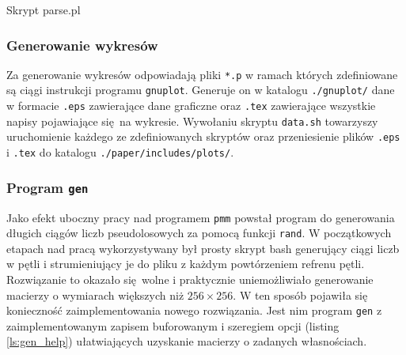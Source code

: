 \begin{listing}
\inputminted[fontsize=\footnotesize,bgcolor=bg,breaklines]{perl}{includes/listings/parse.pl}
\caption{Skrypt parse.pl}
\label{l:parsepl}
\end{listing}

\subsubsection{Generowanie wykresów}
Za generowanie wykresów odpowiadają pliki \texttt{*.p} w ramach których zdefiniowane są ciągi instrukcji programu \texttt{gnuplot}. Generuje on w katalogu \texttt{./gnuplot/} dane w formacie \texttt{.eps} zawierające dane graficzne oraz \texttt{.tex} zawierające wszystkie napisy pojawiające się na wykresie. Wywołaniu skryptu \texttt{data.sh} towarzyszy uruchomienie każdego ze zdefiniowanych skryptów oraz przeniesienie plików \texttt{.eps} i \texttt{.tex} do katalogu \texttt{./paper/includes/plots/}.

\subsubsection{Program \texttt{gen}}
Jako efekt uboczny pracy nad programem \texttt{pmm} powstał program do generowania długich ciągów liczb pseudolosowych za pomocą funkcji \texttt{rand}. W początkowych etapach nad pracą wykorzystywany był prosty skrypt bash generujący ciągi liczb w pętli i strumieniujący je do pliku z każdym powtórzeniem refrenu pętli. Rozwiązanie to okazało się wolne i praktycznie uniemożliwiało generowanie macierzy o wymiarach większych niż \(256\times 256\). W ten sposób pojawiła się konieczność zaimplementowania nowego rozwiązania. Jest nim program \texttt{gen} z zaimplementowanym zapisem buforowanym i szeregiem opcji (listing \ref{ls:gen_help}) ułatwiających uzyskanie macierzy o zadanych własnościach.